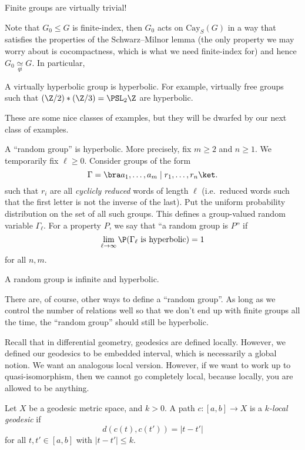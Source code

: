 \documentclass[a4paper]{article}
\newcommand\Cay{\mathrm{Cay}}
\newcommand{\qi}{\underset{qi}{\simeq}}
\begin{document}
\begin{eg}
  Finite groups are virtually trivial!
\end{eg}

Note that $G_0 \leq G$ is finite-index, then $G_0$ acts on $\Cay_S(G)$ in a way that satisfies the properties of the Schwarz--Milnor lemma (the only property we may worry about is cocompactness, which is what we need finite-index for) and hence $G_0 \qi G$. In particular,

\begin{eg}
  A virtually hyperbolic group is hyperbolic. For example, virtually free groups such that $(\Z/2) * (\Z/3) = \PSL_2\Z$ are hyperbolic.
\end{eg}

These are some nice classes of examples, but they will be dwarfed by our next class of examples.

A ``random group'' is hyperbolic. More precisely, fix $m \geq 2$ and $n \geq 1$. We temporarily fix $\ell \geq 0$. Consider groups of the form
\[
  \Gamma = \bra a_1, \ldots, a_m \mid r_1, \ldots, r_n\ket.
\]
such that $r_i$ are all \emph{cyclicly reduced} words of length $\ell$ (i.e.\ reduced words such that the first letter is not the inverse of the last). Put the uniform probability distribution on the set of all such groups. This defines a group-valued random variable $\Gamma_\ell$. For a property $P$, we say that ``a random group is $P$'' if %
\[
  \lim_{\ell \to \infty}\P(\text{$\Gamma_\ell$ is hyperbolic}) = 1
\]
for all $n, m$.
\begin{thm}[Gromov]
  A random group is infinite and hyperbolic.
\end{thm}

There are, of course, other ways to define a ``random group''. As long as we control the number of relations well so that we don't end up with finite groups all the time, the ``random group'' should still be hyperbolic.

Recall that in differential geometry, geodesics are defined locally. However, we defined our geodesics to be embedded interval, which is necessarily a global notion. We want an analogous local version. However, if we want to work up to quasi-isomorphism, then we cannot go completely local, because locally, you are allowed to be anything.

\begin{defi}
  Let $X$ be a geodesic metric space, and $k > 0$. A path $c: [a, b] \to X$ is a \emph{$k$-local geodesic} if
  \[
    d(c(t), c(t')) = |t - t'|
  \]
  for all $t, t' \in [a, b]$ with $|t - t'| \leq k$.
\end{defi}
\end{document}
